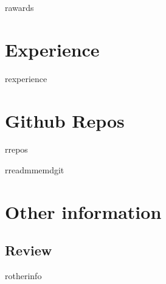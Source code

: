 \documentclass[letterpaper]{twentysecondcv} %
\begin{document}
\begin{twentyshort} %
	rawards
\end{twentyshort}


\section{Experience}

\begin{twenty} %
	rexperience
\end{twenty}


\section{Github Repos}

\begin{twenty} %
	rrepos
\end{twenty}

rreadmmemdgit

\section{Other information}

\subsection{Review}

rotherinfo

\end{document}
